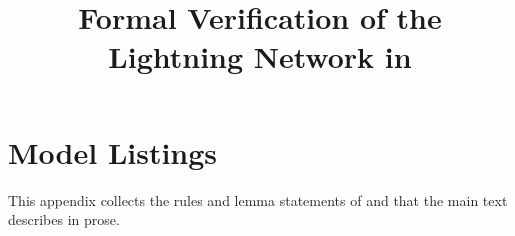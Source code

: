 \documentclass[conference]{IEEEtran}
\begin{document}
\title{Formal Verification of the Lightning Network in \tamarin}
\author{}   %
\maketitle












\appendices

\section{Model Listings}\label{app:listings}
This appendix collects the rules and lemma statements of  and  that the main text describes in prose.




\end{document}
